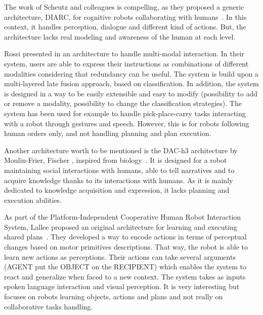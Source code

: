 \documentclass[a4paper,11pt,twoside]{StyleThese}
\begin{document}
The work of Scheutz and colleagues is compelling, as they proposed a generic architecture, DIARC, for cognitive robots collaborating with humans~\cite{scheutz_2006_utility,scheutz_2019_overview}. In this context, it handles perception, dialogue and different kind of actions. But, the architecture lacks real modeling and awareness of the human at each level.

Rossi \etal{} presented in \cite{rossi_2013_extensible} an architecture to handle multi-modal interaction. In their system, users are able to express their instructions as combinations of different modalities considering that redundancy can be useful. The system is build upon a multi-layered late fusion approach, based on classification. In addition, the system is designed in a way to be easily extensible and easy to modify (\eg possibility to add or remove a modality, possibility to change the classification strategies). The system has been used for example to handle pick-place-carry tasks interacting with a robot through gestures and speech. However, this is for robots following human orders only, and not handling planning and plan execution.

Another architecture worth to be mentioned is the DAC-h3 architecture by Moulin-Frier, Fischer \etal, inspired from biology~\cite{moulin_2017_dac}. It is designed for a robot maintaining social interactions with humans, able to tell narratives and to acquire knowledge thanks to its interactions with humans. As it is mainly dedicated to knowledge acquisition and expression, it lacks planning and execution abilities.

As part of the Platform-Independent Cooperative Human Robot Interaction System, Lallee \etal{} proposed an original architecture for learning and executing shared plans~\cite{lallee_2012_towards}. They developed a way to encode actions in terms of perceptual changes based on motor primitives descriptions. That way, the robot is able to learn new actions as perceptions. Their actions can take several arguments (\eg AGENT put the OBJECT on the RECIPIENT) which enables the system to react and generalize when faced to a new context. The system takes as inputs spoken language interaction and visual perception. It is very interesting but focuses on robots learning objects, actions and plans and not really on collaborative tasks handling. 
\end{document}
